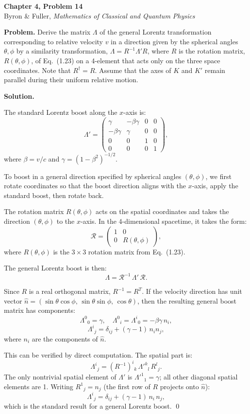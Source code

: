 \documentclass[12pt]{article}
\begin{document}
\begin{center}
{\Large\bfseries Chapter 4, Problem 14}\\[6pt]
Byron \& Fuller, \textit{Mathematics of Classical and Quantum Physics}
\end{center}

\bigskip

\textbf{Problem.} Derive the matrix $\Lambda$ of the general Lorentz transformation corresponding to relative velocity $v$ in a direction given by the spherical angles $\theta, \phi$ by a similarity transformation, $\Lambda = R^{-1}\Lambda'R$, where $R$ is the rotation matrix, $R(\theta, \phi)$, of Eq.\ (1.23) on a 4-element that acts only on the three space coordinates. Note that $R^\dagger = R$. Assume that the axes of $K$ and $K'$ remain parallel during their uniform relative motion.

\bigskip
\textbf{Solution.}

The standard Lorentz boost along the $x$-axis is:
\[
\Lambda' = \begin{pmatrix} \gamma & -\beta\gamma & 0 & 0 \\ -\beta\gamma & \gamma & 0 & 0 \\ 0 & 0 & 1 & 0 \\ 0 & 0 & 0 & 1 \end{pmatrix},
\]
where $\beta = v/c$ and $\gamma = (1-\beta^2)^{-1/2}$.

To boost in a general direction specified by spherical angles $(\theta, \phi)$, we first rotate coordinates so that the boost direction aligns with the $x$-axis, apply the standard boost, then rotate back.

The rotation matrix $R(\theta,\phi)$ acts on the spatial coordinates and takes the direction $(\theta,\phi)$ to the $x$-axis. In the 4-dimensional spacetime, it takes the form:
\[
\mathcal{R} = \begin{pmatrix} 1 & 0 \\ 0 & R(\theta,\phi) \end{pmatrix},
\]
where $R(\theta,\phi)$ is the $3\times 3$ rotation matrix from Eq.\ (1.23).

The general Lorentz boost is then:
\[
\Lambda = \mathcal{R}^{-1}\,\Lambda'\,\mathcal{R}.
\]

Since $R$ is a real orthogonal matrix, $R^{-1} = R^T$. If the velocity direction has unit vector $\hat{n} = (\sin\theta\cos\phi,\, \sin\theta\sin\phi,\, \cos\theta)$, then the resulting general boost matrix has components:
\[
\Lambda^{0}{}_{0} = \gamma, \quad \Lambda^{0}{}_{i} = \Lambda^{i}{}_{0} = -\beta\gamma\, n_i,
\]
\[
\Lambda^{i}{}_{j} = \delta_{ij} + (\gamma - 1)\,n_i n_j,
\]
where $n_i$ are the components of $\hat{n}$.

This can be verified by direct computation. The spatial part is:
\[
\Lambda^{i}{}_{j} = (R^{-1})^{i}{}_{k}\,\Lambda'^{k}{}_{l}\,R^{l}{}_{j}.
\]
The only nontrivial spatial element of $\Lambda'$ is $\Lambda'^{1}{}_{1} = \gamma$; all other diagonal spatial elements are 1. Writing $R^{1}{}_{j} = n_j$ (the first row of $R$ projects onto $\hat{n}$):
\[
\Lambda^{i}{}_{j} = \delta_{ij} + (\gamma-1)\,n_i\,n_j,
\]
which is the standard result for a general Lorentz boost. \qed
\end{document}
